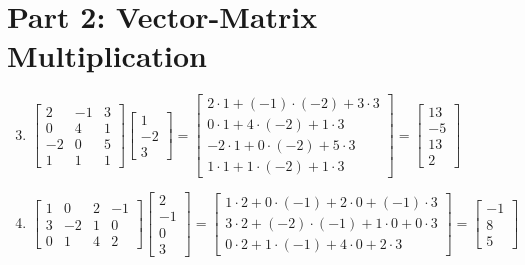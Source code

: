\documentclass{article}
\begin{document}
\section*{Part 2: Vector-Matrix Multiplication}
\begin{enumerate}
\setcounter{enumi}{2}
\item $\begin{bmatrix} 2 & -1 & 3 \\ 0 & 4 & 1 \\ -2 & 0 & 5 \\ 1 & 1 & 1 \end{bmatrix} \begin{bmatrix} 1 \\ -2 \\ 3 \end{bmatrix} = \begin{bmatrix} 
2\cdot1 + (-1)\cdot(-2) + 3\cdot3 \\
0\cdot1 + 4\cdot(-2) + 1\cdot3 \\
-2\cdot1 + 0\cdot(-2) + 5\cdot3 \\
1\cdot1 + 1\cdot(-2) + 1\cdot3 \end{bmatrix} = \boxed{\begin{bmatrix} 13 \\ -5 \\ 13 \\ 2 \end{bmatrix}}$

\item $\begin{bmatrix} 1 & 0 & 2 & -1 \\ 3 & -2 & 1 & 0 \\ 0 & 1 & 4 & 2 \end{bmatrix} \begin{bmatrix} 2 \\ -1 \\ 0 \\ 3 \end{bmatrix} = \begin{bmatrix}
1\cdot2 + 0\cdot(-1) + 2\cdot0 + (-1)\cdot3 \\
3\cdot2 + (-2)\cdot(-1) + 1\cdot0 + 0\cdot3 \\
0\cdot2 + 1\cdot(-1) + 4\cdot0 + 2\cdot3 \end{bmatrix} = \boxed{\begin{bmatrix} -1 \\ 8 \\ 5 \end{bmatrix}}$
\end{enumerate}
\end{document}
